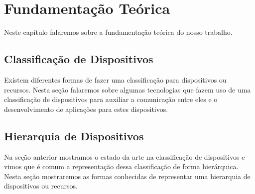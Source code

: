 \chapter{Fundamentação Teórica}

Neste capítulo falaremos sobre a fundamentação teórica do nosso trabalho.

\section{Classificação de Dispositivos}
Existem diferentes formas de fazer uma classificação para dispositivos ou recursos.
Nesta seção falaremos sobre algumas tecnologias que fazem uso de uma classificação de dispositivos para auxiliar a comunicação entre eles e o desenvolvimento de aplicações para estes dispositivos.






\section{Hierarquia de Dispositivos}
Na seção anterior mostramos o estado da arte na classificação de dispositivos e vimos que é comum a representação dessa classificação de forma hierárquica. Nesta seção mostraremos as formas conhecidas de representar uma hierarquia de dispositivos ou recursos.



